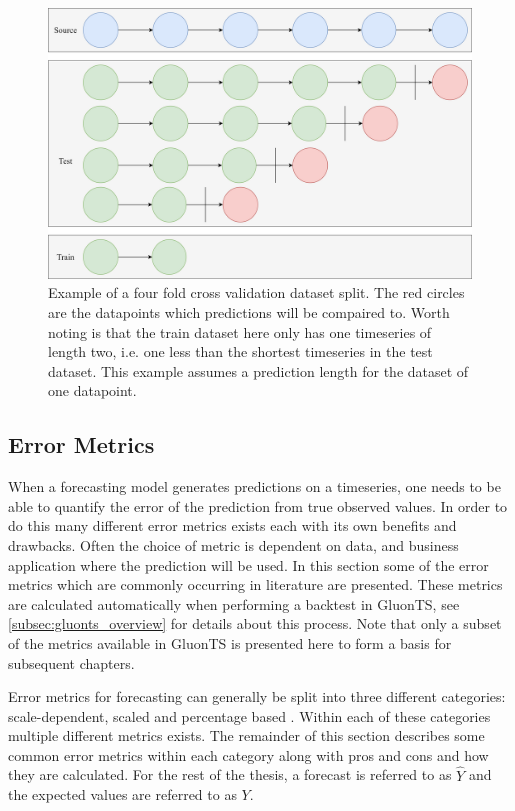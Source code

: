 \begin{figure}[htb]
  \centering
  \includegraphics[width=\linewidth]{./img/k_fold_validation.png}
  \caption{Example of a four fold cross validation dataset split. The red circles are the datapoints which predictions will be compaired to. Worth noting is that the train dataset here only has one timeseries of length two, i.e. one less than the shortest timeseries in the test dataset. This example assumes a prediction length for the dataset of one datapoint.}
  \label{fig:k_fold_validation}
  \endminipage\hfill
\end{figure}


\subsection{Error Metrics}
\label{subsec:error_metrics}
When a forecasting model generates predictions on a timeseries, one needs to be able to quantify the error of the prediction from true observed values. In order to do this many different error metrics exists each with its own benefits and drawbacks. Often the choice of metric is dependent on data, and business application where the prediction will be used. In this section some of the error metrics which are commonly occurring in literature are presented. These metrics are calculated automatically when performing a backtest in GluonTS, see \ref{subsec:gluonts_overview} for details about this process. Note that only a subset of the metrics available in GluonTS is presented here to form a basis for subsequent chapters.

Error metrics for forecasting can generally be split into three different categories: scale-dependent, scaled and percentage based \cite{hyndman_forecasting_3rd}. Within each of these categories multiple different metrics exists. The remainder of this section describes some common error metrics within each category along with pros and cons and how they are calculated. For the rest of the thesis, a forecast is referred to as \(\hat{Y}\) and the expected values are referred to as \(Y\).

